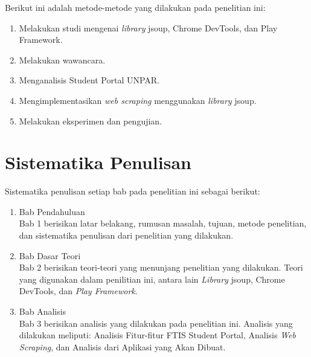 Berikut ini adalah metode-metode yang dilakukan pada penelitian ini:

\begin{enumerate}
	\item Melakukan studi mengenai \textit{library} jsoup, Chrome DevTools, dan Play Framework.
	\item Melakukan wawancara.
	\item Menganalisis Student Portal UNPAR.
	\item Mengimplementasikan \textit{web scraping} menggunakan \textit{library} jsoup.
	\item Melakukan eksperimen dan pengujian.
\end{enumerate}

\section{Sistematika Penulisan}
\label{sec:sistematika_penulisan}

Sistematika penulisan setiap bab pada penelitian ini sebagai berikut:

\begin{enumerate}
  \item Bab Pendahuluan \\
  Bab 1 berisikan latar belakang, rumusan masalah, tujuan, metode penelitian,
  dan sistematika penulisan dari penelitian yang dilakukan.
  \item Bab Dasar Teori \\
  Bab 2 berisikan teori-teori yang menunjang penelitian yang dilakukan. Teori
  yang digunakan dalam penilitian ini, antara lain \textit{Library} jsoup, Chrome DevTools, dan \textit{Play Framework}.
  \item Bab Analisis \\
  Bab 3 berisikan analisis yang dilakukan pada penelitian ini. Analisis yang
  dilakukan meliputi: Analisis Fitur-fitur FTIS Student Portal, Analisis \textit{Web Scraping}, 
	dan Analisis dari Aplikasi yang Akan Dibuat.
\end{enumerate}
